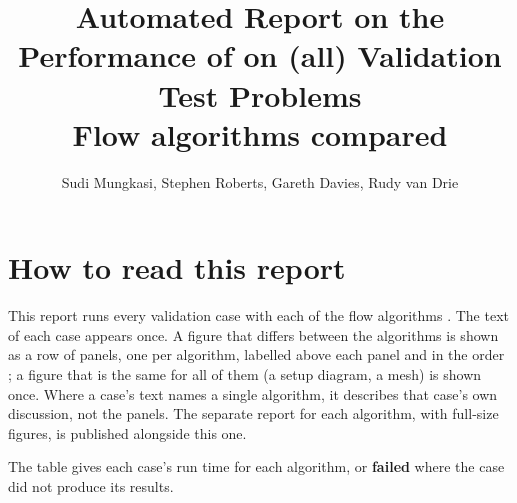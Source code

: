 \documentclass[11pt,a4paper]{report}
\begin{document}

\title{Automated Report on the Performance of \anuga{} on (all) Validation
Test Problems\\[6pt] \large Flow algorithms \algnames{} compared}
\author{Sudi Mungkasi, Stephen Roberts, Gareth Davies, Rudy van Drie}
\maketitle
\tableofcontents

\chapter*{How to read this report}
This report runs every validation case with each of the flow algorithms
\algnames{}. The text of each case appears once. A figure that differs
between the algorithms is shown as a row of panels, one per algorithm,
labelled above each panel and in the order \algnames{}; a figure that is the
same for all of them (a setup diagram, a mesh) is shown once. Where a case's
text names a single algorithm, it describes that case's own discussion, not
the panels. The separate report for each algorithm, with full-size figures,
is published alongside this one.

The table gives each case's run time for each algorithm, or \textbf{failed}
where the case did not produce its results.

\begin{small}

\end{small}






\end{document}
